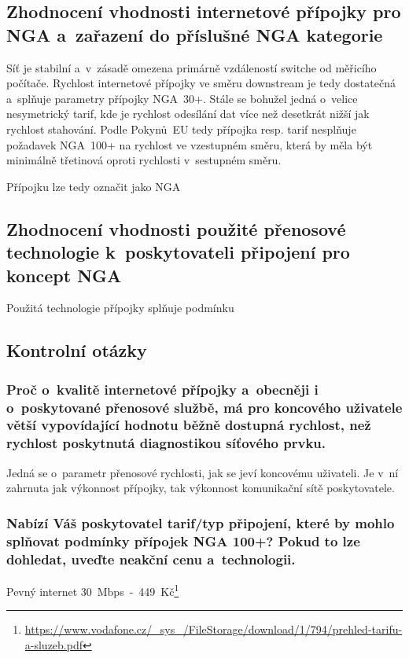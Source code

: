 \documentclass[a4paper,12pt]{article}   %
\begin{document}
\subsection*{Zhodnocení vhodnosti internetové přípojky pro NGA a~zařazení do příslušné NGA kategorie}
Síť je stabilní a~v~zásadě omezena primárně vzdáleností switche od měřicího počítače. Rychlost internetové přípojky ve směru downstream je tedy dostatečná a~splňuje parametry přípojky NGA~30+. Stále se bohužel jedná o~velice nesymetrický tarif, kde je rychlost odesílání dat více než desetkrát nižší jak rychlost stahování. Podle Pokynů~EU tedy přípojka resp. tarif nesplňuje požadavek NGA~100+ na rychlost ve vzestupném směru, která by měla být minimálně třetinová oproti rychlosti v~sestupném směru.

Přípojku lze tedy označit jako NGA

\subsection*{Zhodnocení vhodnosti použité přenosové technologie k~poskytovateli připojení pro koncept NGA}
Použitá technologie přípojky splňuje podmínku 

\subsection*{Kontrolní otázky}
\subsubsection*{Proč o~kvalitě internetové přípojky a~obecněji i o~poskytované přenosové službě, má pro koncového uživatele větší vypovídající hodnotu běžně dostupná rychlost, než rychlost poskytnutá diagnostikou síťového prvku.}
Jedná se o~parametr přenosové rychlosti, jak se jeví koncovému uživateli. Je v~ní zahrnuta jak výkonnost přípojky, tak výkonnost komunikační sítě poskytovatele.

\subsubsection*{Nabízí Váš poskytovatel tarif/typ připojení, které by mohlo splňovat podmínky přípojek NGA 100+? Pokud to lze dohledat, uveďte neakční cenu a~technologii.}
Pevný internet 30~Mbps~-~449~Kč\footnote{\url{https://www.vodafone.cz/_sys_/FileStorage/download/1/794/prehled-tarifu-a-sluzeb.pdf}}
\end{document}
